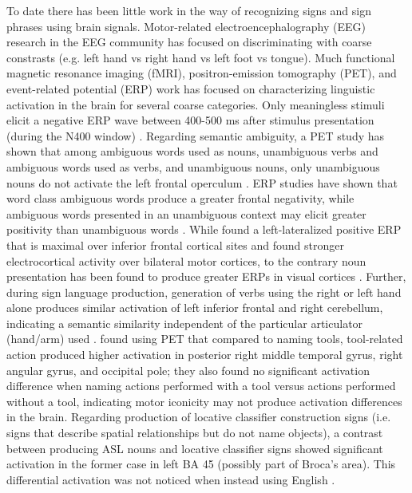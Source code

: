 \documentclass{proposal}
\begin{document}
To date there has been little work in the way of recognizing signs and sign phrases using brain signals. Motor-related electroencephalography (EEG) research in the EEG community has focused on discriminating with coarse constrasts (e.g. left hand vs right hand vs left foot vs tongue). Much functional magnetic resonance imaging (fMRI), positron-emission tomography (PET), and event-related potential (ERP) work has focused on characterizing linguistic activation in the brain for several coarse categories. Only meaningless stimuli elicit a negative ERP wave between 400-500 ms after stimulus presentation (during the N400 window) \cite[]{supp2005_smr}. Regarding semantic ambiguity, a PET study has shown that among ambiguous words used as nouns, unambiguous verbs and ambiguous words used as verbs, and unambiguous nouns, only unambiguous nouns do not activate the left frontal operculum \cite[]{tranel2005_env}. ERP studies have shown that word class ambiguous words produce a greater frontal negativity, while ambiguous words presented in an unambiguous context may elicit greater positivity than unambiguous words \cite[]{lee2006_mme}. While \cite{dehaene1995_eec} found a left-lateralized positive ERP that is maximal over inferior frontal cortical sites and \cite{hjorth1975_oie, perrin1988_sss} found stronger electrocortical activity over bilateral motor cortices, to the contrary noun presentation has been found to produce greater ERPs in visual cortices \cite[]{hjorth1975_oie, perrin1988_sss}. Further, during sign language production, generation of verbs using the right or left hand alone produces similar activation of left inferior frontal and right cerebellum, indicating a semantic similarity independent of the particular articulator (hand/arm) used \cite[]{corina2003_llb}. \cite{emmorey2004_mis} found using PET that compared to naming tools, tool-related action produced higher activation in posterior right middle temporal gyrus, right angular gyrus, and occipital pole; they also found no significant activation difference when naming actions performed with a tool versus actions performed without a tool, indicating motor iconicity may not produce activation differences in the brain. Regarding production of locative classifier construction signs (i.e. signs that describe spatial relationships but do not name objects), a contrast between producing ASL nouns and locative classifier signs showed significant activation in the former case in left BA 45 (possibly part of Broca's area). This differential activation was not noticed when instead using English \cite[]{emmorey_broca_region_2006}.
\end{document}
